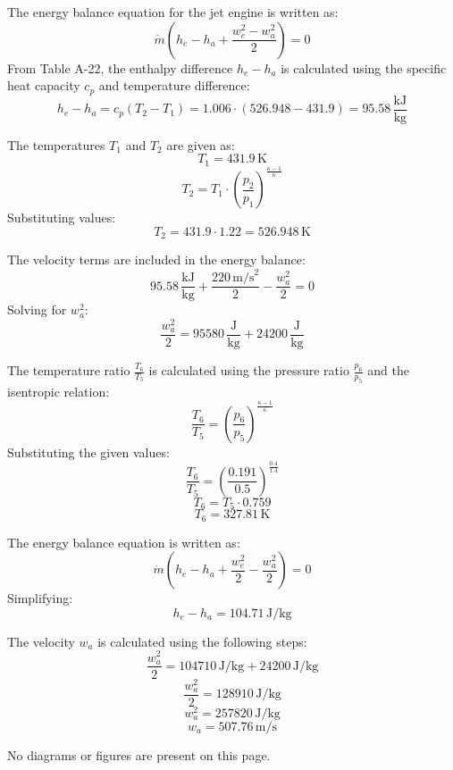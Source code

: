 The energy balance equation for the jet engine is written as:  
\[
\dot{m} \left( h_e - h_a + \frac{w_e^2 - w_a^2}{2} \right) = 0
\]  
From Table A-22, the enthalpy difference \( h_e - h_a \) is calculated using the specific heat capacity \( c_p \) and temperature difference:  
\[
h_e - h_a = c_p (T_2 - T_1) = 1.006 \cdot (526.948 - 431.9) = 95.58 \, \frac{\text{kJ}}{\text{kg}}
\]  

The temperatures \( T_1 \) and \( T_2 \) are given as:  
\[
T_1 = 431.9 \, \text{K}
\]  
\[
T_2 = T_1 \cdot \left( \frac{p_2}{p_1} \right)^{\frac{\kappa - 1}{\kappa}}
\]  
Substituting values:  
\[
T_2 = 431.9 \cdot 1.22 = 526.948 \, \text{K}
\]  

The velocity terms are included in the energy balance:  
\[
95.58 \, \frac{\text{kJ}}{\text{kg}} + \frac{220 \, \text{m/s}^2}{2} - \frac{w_a^2}{2} = 0
\]  
Solving for \( w_a^2 \):  
\[
\frac{w_a^2}{2} = 95580 \, \frac{\text{J}}{\text{kg}} + 24200 \, \frac{\text{J}}{\text{kg}}
\]

The temperature ratio \( \frac{T_6}{T_5} \) is calculated using the pressure ratio \( \frac{p_6}{p_5} \) and the isentropic relation:  
\[
\frac{T_6}{T_5} = \left( \frac{p_6}{p_5} \right)^{\frac{\kappa - 1}{\kappa}}
\]  
Substituting the given values:  
\[
\frac{T_6}{T_5} = \left( \frac{0.191}{0.5} \right)^{\frac{0.4}{1.4}}
\]  
\[
T_6 = T_5 \cdot 0.759
\]  
\[
T_6 = 327.81 \, \text{K}
\]  

The energy balance equation is written as:  
\[
\dot{m} \left( h_e - h_a + \frac{w_e^2}{2} - \frac{w_a^2}{2} \right) = 0
\]  
Simplifying:  
\[
h_e - h_a = 104.71 \, \text{J/kg}
\]  

The velocity \( w_a \) is calculated using the following steps:  
\[
\frac{w_a^2}{2} = 104710 \, \text{J/kg} + 24200 \, \text{J/kg}
\]  
\[
\frac{w_a^2}{2} = 128910 \, \text{J/kg}
\]  
\[
w_a^2 = 257820 \, \text{J/kg}
\]  
\[
w_a = 507.76 \, \text{m/s}
\]  

No diagrams or figures are present on this page.